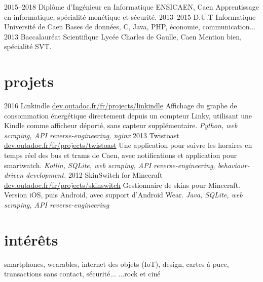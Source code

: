 \documentclass[]{friggeri-cv}
\begin{document}
\begin{entrylist}
    \entry
    {2015--2018}
    {Diplôme d’Ingénieur {\normalfont en Informatique}}
    {ENSICAEN, Caen}
    {Apprentissage en informatique, spécialité monétique et sécurité.}
    \entry
    {2013--2015}
    {D.U.T {\normalfont Informatique}}
    {Université de Caen}
    {Bases de données, C, Java, PHP, économie, communication...}
    \entry
    {2013}
    {Baccalauréat {\normalfont Scientifique}}
    {Lycée Charles de Gaulle, Caen}
    {Mention bien, spécialité SVT.}
\end{entrylist}

\section{projets}

\begin{entrylist}
	\entry
	{2016}
	{Linkindle}
	{\href{https://dev.outadoc.fr/fr/projects/linkindle}{dev.outadoc.fr/fr/projects/linkindle}}
	{Affichage du graphe de consommation énergétique directement depuis un compteur Linky, utilisant une Kindle comme afficheur déporté, sans capteur supplémentaire.
	\emph{Python, web scraping, API reverse-engineering, nginx}}
    \entry
    {2013}
    {Twistoast}
    {\href{https://dev.outadoc.fr/fr/projects/twistoast}{dev.outadoc.fr/fr/projects/twistoast}}
    {Une application pour suivre les horaires en temps réel des bus et trams de Caen, avec notifications et application pour smartwatch.
    \emph{Kotlin, SQLite, web scraping, API reverse-engineering, behaviour-driven development.}}
    \entry
    {2012}
    {SkinSwitch {\normalfont for Minecraft}}
    {\href{https://dev.outadoc.fr/fr/projects/skinswitch}{dev.outadoc.fr/fr/projects/skinswitch}}
    {Gestionnaire de skins pour Minecraft. Version iOS, puis Android, avec support d'Android Wear.
    \emph{Java, SQLite, web scraping, API reverse-engineering}}
\end{entrylist}

\section{intérêts}

smartphones, wearables, internet des objets (IoT), design, cartes à puce, transactions sans contact, sécurité...
...rock et ciné
\end{document}
